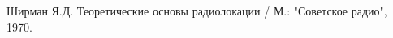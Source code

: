 \begin{thebibliography}{1}
     Ширман Я.Д. Теоретические основы радиолокации / М.: "Советское радио"{}, 1970.
\end{thebibliography}